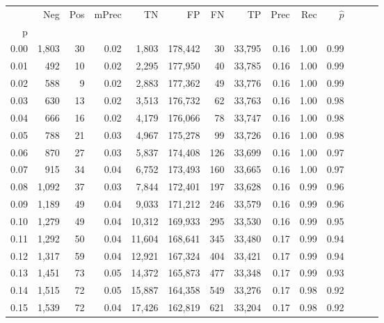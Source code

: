 \begin{tabular}{rrrrrrrrrrrrrr}
\toprule
{} &    Neg &  Pos & mPrec &       TN &       FP &      FN &      TP &  Prec &   Rec & $\hat{p}$ \\
p    &        &      &       &          &          &         &         &       &       &           \\
\midrule
0.00 &  1,803 &   30 &  0.02 &    1,803 &  178,442 &      30 &  33,795 &  0.16 &  1.00 &      0.99 \\
0.01 &    492 &   10 &  0.02 &    2,295 &  177,950 &      40 &  33,785 &  0.16 &  1.00 &      0.99 \\
0.02 &    588 &    9 &  0.02 &    2,883 &  177,362 &      49 &  33,776 &  0.16 &  1.00 &      0.99 \\
0.03 &    630 &   13 &  0.02 &    3,513 &  176,732 &      62 &  33,763 &  0.16 &  1.00 &      0.98 \\
0.04 &    666 &   16 &  0.02 &    4,179 &  176,066 &      78 &  33,747 &  0.16 &  1.00 &      0.98 \\
0.05 &    788 &   21 &  0.03 &    4,967 &  175,278 &      99 &  33,726 &  0.16 &  1.00 &      0.98 \\
0.06 &    870 &   27 &  0.03 &    5,837 &  174,408 &     126 &  33,699 &  0.16 &  1.00 &      0.97 \\
0.07 &    915 &   34 &  0.04 &    6,752 &  173,493 &     160 &  33,665 &  0.16 &  1.00 &      0.97 \\
0.08 &  1,092 &   37 &  0.03 &    7,844 &  172,401 &     197 &  33,628 &  0.16 &  0.99 &      0.96 \\
0.09 &  1,189 &   49 &  0.04 &    9,033 &  171,212 &     246 &  33,579 &  0.16 &  0.99 &      0.96 \\
0.10 &  1,279 &   49 &  0.04 &   10,312 &  169,933 &     295 &  33,530 &  0.16 &  0.99 &      0.95 \\
0.11 &  1,292 &   50 &  0.04 &   11,604 &  168,641 &     345 &  33,480 &  0.17 &  0.99 &      0.94 \\
0.12 &  1,317 &   59 &  0.04 &   12,921 &  167,324 &     404 &  33,421 &  0.17 &  0.99 &      0.94 \\
0.13 &  1,451 &   73 &  0.05 &   14,372 &  165,873 &     477 &  33,348 &  0.17 &  0.99 &      0.93 \\
0.14 &  1,515 &   72 &  0.05 &   15,887 &  164,358 &     549 &  33,276 &  0.17 &  0.98 &      0.92 \\
0.15 &  1,539 &   72 &  0.04 &   17,426 &  162,819 &     621 &  33,204 &  0.17 &  0.98 &      0.92 \\

\end{tabular}
